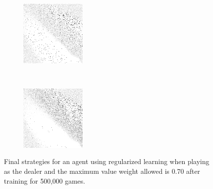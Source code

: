 \begin{figure}
\begin{subfigure}[t]{0.22\textwidth}
		\caption{\peggingmaxavggained}
	\end{subfigure}
~
	\begin{subfigure}[t]{0.22\textwidth}
		\center
		\includegraphics[width=\textwidth]{images/findings/experiments/regularization/strats/0.70/pegging_max_med_gained.png}
		\caption{\peggingmaxmedgained}
	\end{subfigure}
	~
	\begin{subfigure}[t]{0.22\textwidth}
		\center
		\includegraphics[width=\textwidth]{images/findings/experiments/regularization/strats/0.70/pegging_min_avg_given.png}
		\caption{\peggingminavggiven}
	\end{subfigure}

\caption{
	Final strategies for an agent using regularized learning
	when playing as the dealer
	and the maximum value weight allowed is 0.70
	after training for 500,000 games.
}
\label{fig:neighbor-strats}
\end{figure}
